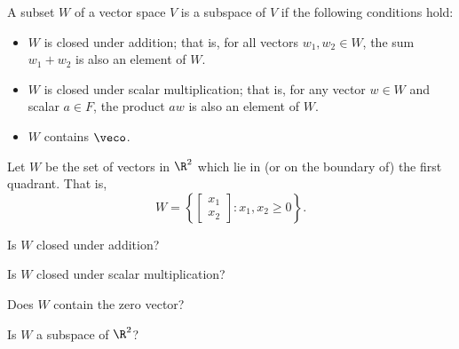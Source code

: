 {}  
A subset $W$ of a vector space $V$ is a subspace of $V$ if the following conditions hold:
\begin{itemize}
\item
$W$ is closed under addition; that is, for all vectors $w_1,w_2 \in W$, the sum $w_1+w_2$ is also an
element of $W$.  
\item
$W$ is closed under scalar multiplication; that is, for any vector $w\in W$ and scalar $a \in F$, the
product $aw$ is also an element of $W$.  
\item
$W$ contains $\veco$.  
\end{itemize}




\endedxtext


\endedxvertical







Let $W$ be the set of vectors in $\R^2$ which lie in (or on the boundary of) the first quadrant.  
That is,
\[ W = \left\{ \left[ \begin{array}{c} x_1 \\ x_2 \end{array} \right] : x_1, x_2 \ge 0\right\}. \]



\begin{center}
   
\end{center}

Is $W$ closed under addition?


Is $W$ closed under scalar multiplication?


Does $W$ contain the zero vector?


Is $W$ a subspace of $\R^2$?  



 
